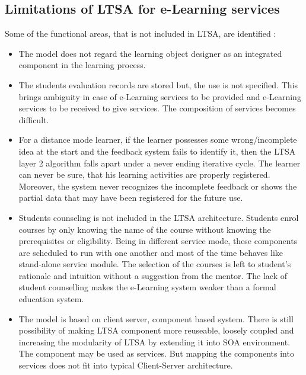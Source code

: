 \subsection{Limitations of LTSA for e-Learning services}
Some of the functional areas, that is not included in LTSA, are identified :
\begin{itemize}
 \item The model does not regard the learning object designer as an integrated
component in the learning process.
 \item The students evaluation records are stored but, the use is not specified. This
brings ambiguity in case of e-Learning services to be provided and e-Learning services to be received to give services. 
The composition of services becomes difficult.
 \item For a distance mode learner, if the learner possesses some wrong/incomplete
idea at the start and the feedback system fails to identify it, then the LTSA layer
2 algorithm falls apart under a never ending iterative cycle. The learner can never
be sure, that his learning activities are properly registered. Moreover, the system
never recognizes the incomplete feedback or shows the partial data that may have
been registered for the future use.
 \item Students counseling is not included in the LTSA architecture. Students enrol
courses by only knowing the name of the course without knowing the prerequisites
or eligibility. Being in different service mode, these components are scheduled to
run with one another and most of the time behaves like stand-alone service module.
The selection of the courses is left to student’s rationale and intuition without a
suggestion from the mentor. The lack of student counselling makes the e-Learning
system weaker than a formal education system.
 \item The model is based on client server, component based system. There is
still possibility of making LTSA component more reuseable, loosely coupled and
increasing the modularity of LTSA by extending it into SOA environment. The
component may be used as services. But mapping the components into services
does not fit into typical Client-Server architecture.

 
\end{itemize}




